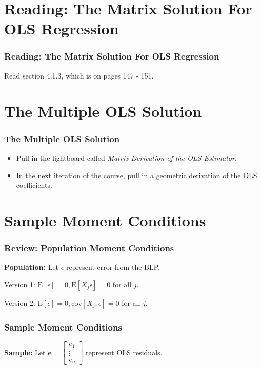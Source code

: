 \documentclass[12pt, block=fill]{beamer}
\newcommand{\E}{\text{E}}
\newcommand{\cov}{\text{cov}}
\newcommand{\bs}{\boldsymbol}
\begin{document}
\section{Reading: The Matrix Solution For OLS Regression}

\begin{frame}
  \frametitle{Reading: The Matrix Solution For OLS Regression}
Read section 4.1.3, which is on pages 147 - 151.
\end{frame}

\section{The Multiple OLS Solution}


\begin{frame}
  \frametitle{The Multiple OLS Solution}
  
  \begin{itemize}
    \item Pull in the lightboard called \textit{Matrix Derivation of
        the OLS Estimator}.
    \item In the next iteration of the course, pull in a geometric
      derivation of the OLS coefficients. 
  \end{itemize} 
\end{frame}



\section{Sample Moment Conditions}

\begin{frame}[t]
  \frametitle{Review: Population Moment Conditions}
\textbf{Population:}  Let $\epsilon$ represent error from the BLP.

\vspace{.1cm}
Version 1: $\E[\epsilon]=0, \E[X_j \epsilon] = 0$  for all $j$.  

Version 2: $\E[\epsilon]=0, \cov[X_j,\epsilon]=0$ for all $j$. 


\end{frame}



\begin{frame}[t]
  \frametitle{Sample Moment Conditions}

\textbf{Sample:} Let $\bs e = \left[ \begin{matrix} e_1 \\ \vdots \\ e_n \end{matrix} \right]$ represent OLS residuals.

\end{frame}
\end{document}
